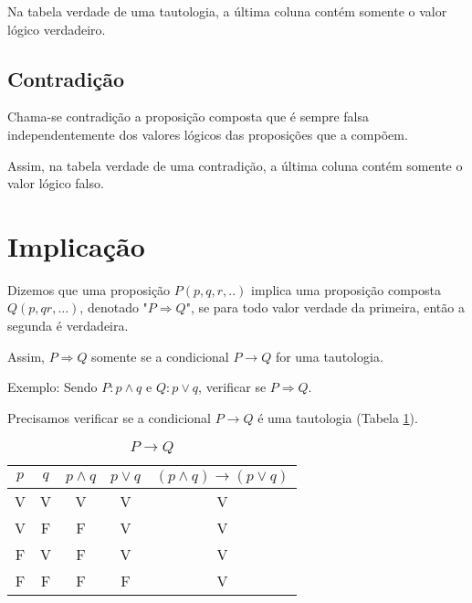 Na tabela verdade de uma tautologia, a {\'u}ltima coluna cont{\'e}m somente o valor l{\'o}gico verdadeiro.

\subsection{Contradi{\c c}{\~a}o}
\begin{definicao}[Contradi{\c c}{\~a}o] Chama-se contradi{\c c}{\~a}o a proposi{\c c}{\~a}o composta que {\'e} sempre falsa independentemente dos valores l{\'o}gicos das proposi{\c c}{\~o}es que a comp{\~o}em.\end{definicao}

Assim, na tabela verdade de uma contradi{\c c}{\~a}o, a {\'u}ltima coluna cont{\'e}m somente o valor l{\'o}gico falso.

\section{Implica{\c c}{\~a}o}
\begin{definicao}[Implica{\c c}{\~a}o] Dizemos que uma proposi{\c c}{\~a}o $P(p,q,r,..)$ implica uma proposi{\c c}{\~a}o composta $Q(p,q r,...)$, denotado "$P\Rightarrow Q$", se para todo valor verdade da primeira, ent{\~a}o a segunda {\'e} verdadeira.\end{definicao}

Assim, $P\Rightarrow Q$ somente se a condicional $P\rightarrow Q$ for uma tautologia.

Exemplo: Sendo $P:p\wedge q$ e $Q:p\vee q$, verificar se $P\Rightarrow Q$.

Precisamos verificar se a condicional $P\rightarrow Q$ {\'e} uma tautologia (Tabela \ref{3}).
\begin{table}[h]
   \centering 
   \setlength{\arrayrulewidth}{0,5\arrayrulewidth}
   \caption{\it $P\rightarrow Q$}
   \begin{tabular}{|c|c|c|c|c|} 
      \hline
      $p$ & $q$ & $p\wedge q$ & $p\vee q$ & $(p\wedge q)\rightarrow(p\vee q)$ \\
     \hline
      V & V & V & V & V \\
      \hline
      V & F & F & V & V \\
      \hline
      F & V & F & V & V \\
      \hline
      F & F & F & F & V \\
      \hline
   \end{tabular}
\label{3}
\end{table}

